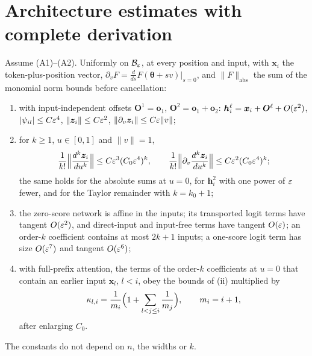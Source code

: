 \section{Architecture estimates with complete derivation}
\label{app:network}

\begin{proposition}
\label{prop:network}
Assume (A1)--(A2). Uniformly on $\mathcal B_{\varepsilon}$, at every position and input, with $\bm x_i$ the token-plus-position vector,
$\partial_vF=\frac{d}{ds}F(\bm\theta+sv)|_{s=0}$, and $\|F\|_{\mathrm{abs}}$ the sum of the monomial norm bounds before cancellation:
\begin{enumerate}[label=(\roman*),leftmargin=*,itemsep=1pt,topsep=2pt]
\item with input-independent offsets $\bm O^1=\bm o_1$, $\bm O^2=\bm o_1+\bm o_2$: $\bm h_i^\ell=\bm x_i+\bm O^\ell+O(\varepsilon^2)$, $|\psi_{il}|\le C\varepsilon^4$,
$\|\bm z_i\|\le C\varepsilon^2$, $\|\partial_v\bm z_i\|\le C\varepsilon\|v\|$;
\item for $k\ge1$, $u\in[0,1]$ and $\|v\|=1$,
\[
 \frac{1}{k!}\Bigl\|\frac{d^k\bm z_i}{du^k}\Bigr\|\le C\varepsilon^3(C_0\varepsilon^4)^k,\qquad
 \frac{1}{k!}\Bigl\|\partial_v\frac{d^k\bm z_i}{du^k}\Bigr\|\le C\varepsilon^2(C_0\varepsilon^4)^k;
\]
the same holds for the absolute sums at $u=0$, for $\bm h^2_i$ with one power of $\varepsilon$ fewer, and for the Taylor remainder with $k=k_0+1$;
\item the zero-score network is affine in the inputs; its transported logit terms have tangent $O(\varepsilon^2)$, and direct-input and
input-free terms have tangent $O(\varepsilon)$; an order-$k$ coefficient contains at most $2k+1$ inputs; a one-score logit term has size
$O(\varepsilon^7)$ and tangent $O(\varepsilon^6)$;
\item with full-prefix attention, the terms of the order-$k$ coefficients at $u=0$ that contain an earlier input $\bm x_l$, $l<i$, obey the
bounds of (ii) multiplied by
\begin{equation}
 \kappa_{l,i}=\frac{1}{m_i}\Bigl(1+\sum_{l<j\le i}\frac{1}{m_j}\Bigr),\qquad m_i=i+1,
 \label{eq:dilution}
\end{equation}
after enlarging $C_0$.
\end{enumerate}
The constants do not depend on $n$, the widths or $k$.
\end{proposition}


